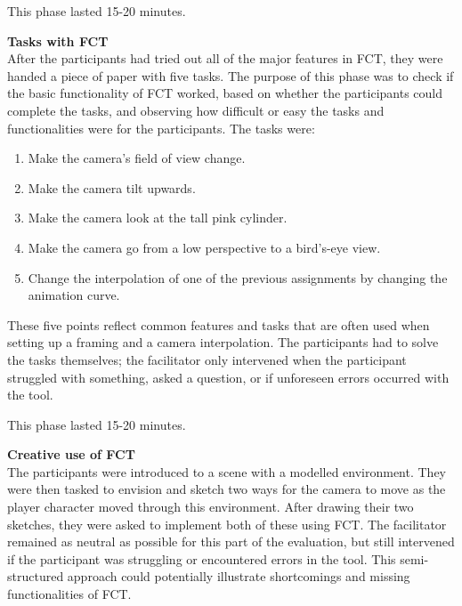 This phase lasted 15-20 minutes.

\textbf{Tasks with FCT}\\
After the participants had tried out all of the major features in FCT, they were handed a piece of paper with five tasks. The purpose of this phase was to check if  the basic functionality of FCT worked, based on whether the participants could complete the tasks, and observing how difficult or easy the tasks and functionalities were for the participants. The tasks were:


\begin{enumerate}
\item Make the camera's field of view change.
\item Make the camera tilt upwards.
\item Make the camera look at the tall pink cylinder.
\item Make the camera go from a low perspective to a bird's-eye view.
\item Change the interpolation of one of the previous assignments by changing the animation curve.
\end{enumerate} 

These five points reflect common features and tasks that are often used when setting up a framing and a camera interpolation. The participants had to solve the tasks themselves; the facilitator only intervened when the participant struggled with something, asked a question, or if unforeseen errors occurred with the tool.

This phase lasted 15-20 minutes.

\textbf{Creative use of FCT}\\
The participants were introduced to a scene with a modelled environment. They were then tasked to envision and sketch two ways for the camera to move as the player character moved through this environment. After drawing their two sketches, they were asked to implement both of these using FCT. The facilitator remained as neutral as possible for this part of the evaluation, but still intervened if the participant was struggling or encountered errors in the tool. This semi-structured approach could potentially illustrate shortcomings and missing functionalities of FCT.


